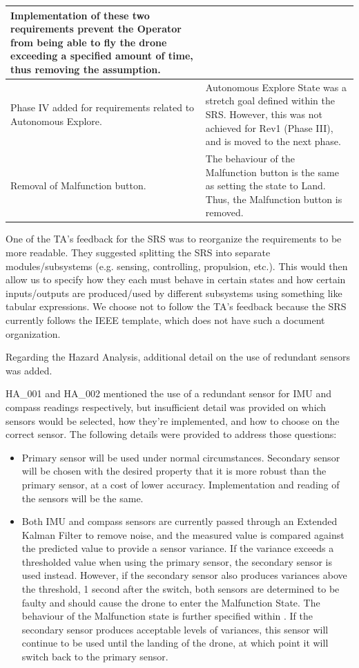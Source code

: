 \documentclass{article}
\begin{document}
\begin{table}[!h]
\begin{center}
\begin{tabular}{ | m{4.7cm} | m{10.7cm} | }
    Implementation of these two requirements prevent the Operator from being able to fly the drone exceeding a specified amount of time, thus removing the assumption.  \\
\hline
Phase IV added for requirements related to Autonomous Explore. &
    Autonomous Explore State was a stretch goal defined within the SRS. However, this was not achieved for Rev1 (Phase III), and is moved to the next phase. \\
\hline
Removal of Malfunction button. &
    The behaviour of the Malfunction button is the same as setting the state to Land. Thus, the Malfunction button is removed. \\
\hline
\end{tabular}
\end{center}
\end{table}

\clearpage

One of the TA's feedback for the SRS was to reorganize the requirements to be more readable. They suggested splitting the SRS into separate modules/subsystems (e.g. sensing, controlling, propulsion, etc.). This would then allow us to  specify how they each must behave in certain states and how certain inputs/outputs are produced/used by different subsystems using something like tabular expressions. We choose not to follow the TA's feedback because the SRS currently follows the IEEE template, which does not have such a document organization. 

Regarding the Hazard Analysis, additional detail on the use of redundant sensors was added.

HA\_001 and HA\_002 mentioned the use of a redundant sensor for IMU and compass readings respectively, but insufficient detail was provided on which sensors would be selected, how they're implemented, and how to choose on the correct sensor.
The following details were provided to address those questions:
\begin{itemize}
    \item Primary sensor will be used under normal circumstances. Secondary sensor will be chosen with the desired property that it is more robust than the primary sensor, at a cost of lower accuracy. Implementation and reading of the sensors will be the same.
    \item Both IMU and compass sensors are currently passed through an Extended Kalman Filter to remove noise, and the measured value is compared against the predicted value to provide a sensor variance. If the variance exceeds a thresholded value when using the primary sensor, the secondary sensor is used instead. However, if the secondary sensor also produces variances above the threshold, 1 second after the switch, both sensors are determined to be faulty and should cause the drone to enter the Malfunction State. The behaviour of the Malfunction state is further specified within . If the secondary sensor produces acceptable levels of variances, this sensor will continue to be used until the landing of the drone, at which point it will switch back to the primary sensor.
\end{itemize}
\end{document}
